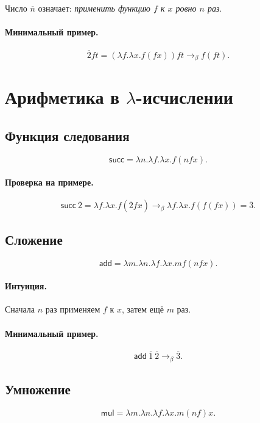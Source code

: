 \documentclass[12pt,a4paper]{article}
\theoremstyle{remark}
\begin{document}
Число $\overline{n}$ означает: \emph{применить функцию $f$ к $x$ ровно $n$ раз}.

\paragraph{Минимальный пример.}
\[
\overline{2}ft
=
(\lambda f.\lambda x.f(fx))ft
\to_\beta
f(ft).
\]

\section{Арифметика в $\lambda$-исчислении}

\subsection{Функция следования}

\[
\mathsf{succ}
=
\lambda n.\lambda f.\lambda x.f(nfx).
\]

\paragraph{Проверка на примере.}
\[
\mathsf{succ}\ \overline{2}
=
\lambda f.\lambda x.f(\overline{2}fx)
\to_\beta
\lambda f.\lambda x.f(f(fx))
=
\overline{3}.
\]

\subsection{Сложение}

\[
\mathsf{add}
=
\lambda m.\lambda n.\lambda f.\lambda x.mf(nfx).
\]

\paragraph{Интуиция.}
Сначала $n$ раз применяем $f$ к $x$, затем ещё $m$ раз.

\paragraph{Минимальный пример.}
\[
\mathsf{add}\ \overline{1}\ \overline{2}
\to_\beta
\overline{3}.
\]

\subsection{Умножение}

\[
\mathsf{mul}
=
\lambda m.\lambda n.\lambda f.\lambda x.m(nf)x.
\]
\end{document}
